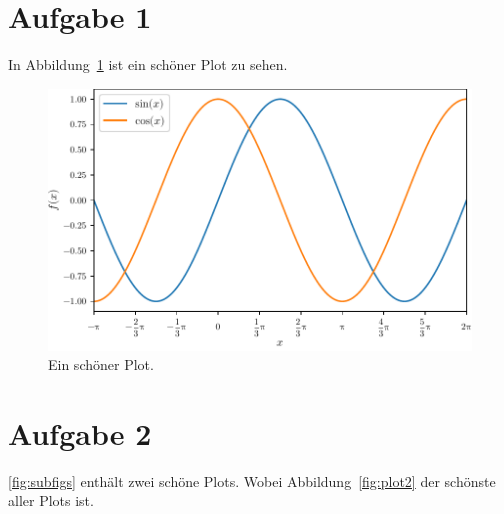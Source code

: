 \documentclass{scrartcl}
\begin{document}
\section*{Aufgabe 1}

In Abbildung~\ref{fig:plot1} ist ein schöner Plot zu sehen.
\blindtext
\begin{figure}
  \centering
  \includegraphics[scale=1]{plot1.pdf}
  \caption{Ein schöner Plot.}
  \label{fig:plot1}
\end{figure}
\blindtext

\section*{Aufgabe 2}

\autoref{fig:subfigs} enthält zwei schöne Plots.
Wobei Abbildung~\ref{fig:plot2} der schönste aller Plots ist.
\end{document}

